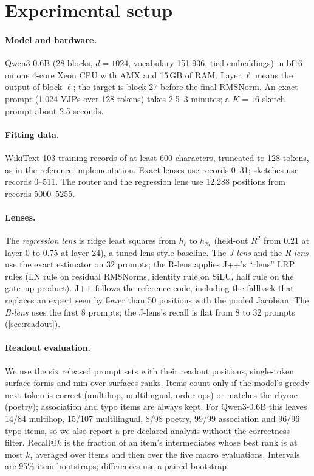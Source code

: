 \documentclass[11pt]{article}
\theoremstyle{definition}
\begin{document}
\section{Experimental setup}
\label{sec:setup}

\paragraph{Model and hardware.} Qwen3-0.6B (28 blocks, $d=1024$, vocabulary 151,936, tied
embeddings) in bf16 on one 4-core Xeon CPU with AMX and 15\,GB of RAM. Layer $\ell$ means the output of
block $\ell$; the target is block 27 before the final RMSNorm. An exact prompt (1,024 VJPs over 128
tokens) takes 2.5--3 minutes; a $K=16$ sketch prompt about 2.5 seconds.

\paragraph{Fitting data.} WikiText-103 training records of at least 600 characters, truncated to 128
tokens, as in the reference implementation. Exact lenses use records 0--31; sketches use records
0--511. The router and the regression lens use 12,288 positions from records 5000--5255.

\paragraph{Lenses.} The \emph{regression lens} is ridge least squares from $h_\ell$ to $h_{27}$ (held-out
$R^2$ from 0.21 at layer 0 to 0.75 at layer 24), a tuned-lens-style baseline. The \emph{J-lens} and the
\emph{R-lens} use the exact estimator on 32 prompts; the R-lens applies J++'s ``rlens'' LRP rules
(LN rule on residual RMSNorms, identity rule on SiLU, half rule on the gate--up product). J++ follows
the reference code, including the fallback that replaces an expert seen by fewer than 50 positions
with the pooled Jacobian. The \emph{B-lens} uses the first 8 prompts; the J-lens's recall is flat from 8
to 32 prompts (\cref{sec:readout}).

\paragraph{Readout evaluation.} We use the six released prompt sets with their readout positions,
single-token surface forms and min-over-surfaces ranks. Items count only if the model's greedy next
token is correct (multihop, multilingual, order-ops) or matches the rhyme (poetry); association and
typo items are always kept. For Qwen3-0.6B this leaves 14/84 multihop, 15/107 multilingual, 8/98
poetry, 99/99 association and 96/96 typo items, so we also report a pre-declared analysis without the
correctness filter. Recall@$k$ is the fraction of an item's intermediates whose best rank is at most
$k$, averaged over items and then over the five macro evaluations. Intervals are 95\% item bootstraps;
differences use a paired bootstrap.
\end{document}
